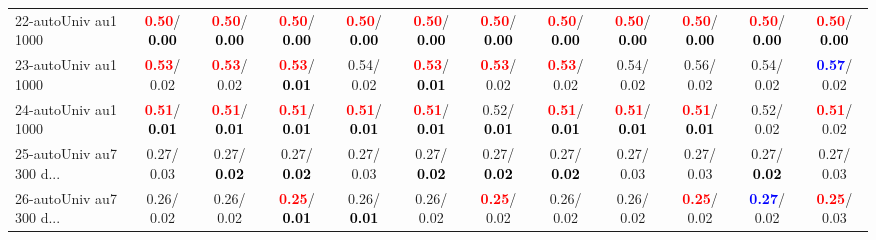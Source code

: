 \begin{table}[h]
\begin{center}
{\begin{tabular}{lc|c|c|c|c|c|c|c|c|c|c}
22-autoUniv au1 1000 & \textcolor{red}{\textbf{  0.50}}/\textcolor{black}{\textbf{  0.00}} & \textcolor{red}{\textbf{  0.50}}/\textcolor{black}{\textbf{  0.00}} & \textcolor{red}{\textbf{  0.50}}/\textcolor{black}{\textbf{  0.00}} & \textcolor{red}{\textbf{  0.50}}/\textcolor{black}{\textbf{  0.00}} & \textcolor{red}{\textbf{  0.50}}/\textcolor{black}{\textbf{  0.00}} & \textcolor{red}{\textbf{  0.50}}/\textcolor{black}{\textbf{  0.00}} & \textcolor{red}{\textbf{  0.50}}/\textcolor{black}{\textbf{  0.00}} & \textcolor{red}{\textbf{  0.50}}/\textcolor{black}{\textbf{  0.00}} & \textcolor{red}{\textbf{  0.50}}/\textcolor{black}{\textbf{  0.00}} & \textcolor{red}{\textbf{  0.50}}/\textcolor{black}{\textbf{  0.00}} & \textcolor{red}{\textbf{  0.50}}/\textcolor{black}{\textbf{  0.00}} \\
23-autoUniv au1 1000 & \textcolor{red}{\textbf{  0.53}}/  0.02 & \textcolor{red}{\textbf{  0.53}}/  0.02 & \textcolor{red}{\textbf{  0.53}}/\textcolor{black}{\textbf{  0.01}} &   0.54/  0.02 & \textcolor{red}{\textbf{  0.53}}/\textcolor{black}{\textbf{  0.01}} & \textcolor{red}{\textbf{  0.53}}/  0.02 & \textcolor{red}{\textbf{  0.53}}/  0.02 &   0.54/  0.02 &   0.56/  0.02 &   0.54/  0.02 & \textcolor{blue}{\textbf{  0.57}}/  0.02 \\
24-autoUniv au1 1000 & \textcolor{red}{\textbf{  0.51}}/\textcolor{black}{\textbf{  0.01}} & \textcolor{red}{\textbf{  0.51}}/\textcolor{black}{\textbf{  0.01}} & \textcolor{red}{\textbf{  0.51}}/\textcolor{black}{\textbf{  0.01}} & \textcolor{red}{\textbf{  0.51}}/\textcolor{black}{\textbf{  0.01}} & \textcolor{red}{\textbf{  0.51}}/\textcolor{black}{\textbf{  0.01}} &   0.52/\textcolor{black}{\textbf{  0.01}} & \textcolor{red}{\textbf{  0.51}}/\textcolor{black}{\textbf{  0.01}} & \textcolor{red}{\textbf{  0.51}}/\textcolor{black}{\textbf{  0.01}} & \textcolor{red}{\textbf{  0.51}}/\textcolor{black}{\textbf{  0.01}} &   0.52/  0.02 & \textcolor{red}{\textbf{  0.51}}/  0.02 \\
25-autoUniv au7 300 d... &   0.27/  0.03 &   0.27/\textcolor{black}{\textbf{  0.02}} &   0.27/\textcolor{black}{\textbf{  0.02}} &   0.27/  0.03 &   0.27/\textcolor{black}{\textbf{  0.02}} &   0.27/\textcolor{black}{\textbf{  0.02}} &   0.27/\textcolor{black}{\textbf{  0.02}} &   0.27/  0.03 &   0.27/  0.03 &   0.27/\textcolor{black}{\textbf{  0.02}} &   0.27/  0.03 \\
26-autoUniv au7 300 d... &   0.26/  0.02 &   0.26/  0.02 & \textcolor{red}{\textbf{  0.25}}/\textcolor{black}{\textbf{  0.01}} &   0.26/\textcolor{black}{\textbf{  0.01}} &   0.26/  0.02 & \textcolor{red}{\textbf{  0.25}}/  0.02 &   0.26/  0.02 &   0.26/  0.02 & \textcolor{red}{\textbf{  0.25}}/  0.02 & \textcolor{blue}{\textbf{  0.27}}/  0.02 & \textcolor{red}{\textbf{  0.25}}/  0.03 \\

\end{tabular}}
\end{center}
\end{table}
